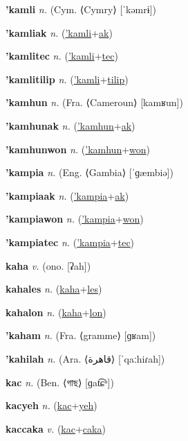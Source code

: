 \textbf{\hypertarget{'kamli}{'kamli}} \textit{n.} (Cym. ⟨Cymry⟩ [ˈkəmrɨ])


\textbf{\hypertarget{'kamliak}{'kamliak}} \textit{n.} (\hyperlink{'kamli}{'kamli}+\allowbreak \hyperlink{ak}{ak})


\textbf{\hypertarget{'kamlitec}{'kamlitec}} \textit{n.} (\hyperlink{'kamli}{'kamli}+\allowbreak \hyperlink{tec}{tec})


\textbf{\hypertarget{'kamlitilip}{'kamlitilip}} \textit{n.} (\hyperlink{'kamli}{'kamli}+\allowbreak \hyperlink{tilip}{tilip})


\textbf{\hypertarget{'kamhun}{'kamhun}} \textit{n.} (Fra. ⟨Cameroun⟩ [kamʁun])


\textbf{\hypertarget{'kamhunak}{'kamhunak}} \textit{n.} (\hyperlink{'kamhun}{'kamhun}+\allowbreak \hyperlink{ak}{ak})


\textbf{\hypertarget{'kamhunwon}{'kamhunwon}} \textit{n.} (\hyperlink{'kamhun}{'kamhun}+\allowbreak \hyperlink{won}{won})


\textbf{\hypertarget{'kampia}{'kampia}} \textit{n.} (Eng. ⟨Gambia⟩ [ˈɡæmbiə])


\textbf{\hypertarget{'kampiaak}{'kampiaak}} \textit{n.} (\hyperlink{'kampia}{'kampia}+\allowbreak \hyperlink{ak}{ak})


\textbf{\hypertarget{'kampiawon}{'kampiawon}} \textit{n.} (\hyperlink{'kampia}{'kampia}+\allowbreak \hyperlink{won}{won})


\textbf{\hypertarget{'kampiatec}{'kampiatec}} \textit{n.} (\hyperlink{'kampia}{'kampia}+\allowbreak \hyperlink{tec}{tec})


\textbf{\hypertarget{kaha}{kaha}} \textit{v.} (ono. [ʡah])


\textbf{\hypertarget{kahales}{kahales}} \textit{n.} (\hyperlink{kaha}{kaha}+\allowbreak \hyperlink{les}{les})


\textbf{\hypertarget{kahalon}{kahalon}} \textit{n.} (\hyperlink{kaha}{kaha}+\allowbreak \hyperlink{lon}{lon})


\textbf{\hypertarget{'kaham}{'kaham}} \textit{n.} (Fra. ⟨gramme⟩ [ɡʁam])


\textbf{\hypertarget{'kahilah}{'kahilah}} \textit{n.} (Ara. ⟨{\arabics{}قاهرة}⟩ [ˈqaːhiɾah])


\textbf{\hypertarget{kac}{kac}} \textit{n.} (Ben. ⟨{\bengali{}গাছ}⟩ [ɡat͡ɕʰ])


\textbf{\hypertarget{kacyeh}{kacyeh}} \textit{n.} (\hyperlink{kac}{kac}+\allowbreak \hyperlink{yeh}{yeh})


\textbf{\hypertarget{kaccaka}{kaccaka}} \textit{v.} (\hyperlink{kac}{kac}+\allowbreak \hyperlink{caka}{caka})


